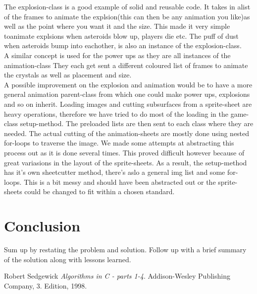 The explosion-class is a good example of solid and reusable code. It takes in alist of the frames to animate the explsion(this can then be any animation you like)as well as the point where you want it and the size. This made it very simple toanimate explsions when asteroids blow up, players die etc. The puff of dust when 
asteroids bump into eachother, is also an instance of the explosion-class.\\

A similar concept is used for the power ups as they are all instances of the animation-class They each get sent a different coloured list of frames to animate the crystals as well as placement and size. \\

A possible improvement on the explosion and animation would be to have a more general animation parent-class from which one could make power ups, explosions and so on inherit. Loading images and cutting subsurfaces from a sprite-sheet are heavy operations, therefore we have tried to do most of the loading in the game-class setup-method. The preloaded lists are then sent to each class where they are needed. The actual cutting of the animation-sheets are mostly done using nested for-loops to traverse
the image. We made some attempts at abstracting this process out as it is done several times. This proved difficult however because of great variasions in the layout of the sprite-sheets. As a result, the setup-method has it's own sheetcutter method, there's aslo a general img list and some for-loops. This is a bit messy and should have been abstracted out or the sprite-sheets could be changed to fit within a chosen standard. 


\section{Conclusion}

Sum up by restating the problem and solution. Follow up with a brief summary of the solution along with lessons learned.



\newpage{}


\begin{thebibliography}{9}

 Robert Sedgewick 
  \emph{Algorithms in C - parts 1-4}.
  Addison-Wesley Publishing Company,
  3. Edition,
  1998.

\end{thebibliography}



